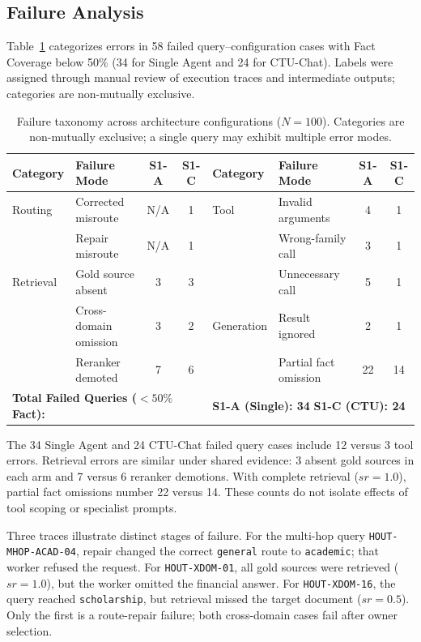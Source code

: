 \subsection{Failure Analysis}
\label{sec:failure_analysis}

Table~\ref{tab:failures} categorizes errors in 58 failed query--configuration cases with Fact Coverage below 50\% (34 for Single Agent and 24 for CTU-Chat). Labels were assigned through manual review of execution traces and intermediate outputs; categories are non-mutually exclusive.

\begin{table}[!htbp]
\centering
\caption{Failure taxonomy across architecture configurations ($N=100$). Categories are non-mutually exclusive; a single query may exhibit multiple error modes.}
\label{tab:failures}
{\footnotesize\setlength{\tabcolsep}{2.2pt}
\begin{tabular}{llcc|llcc}
\toprule
\textbf{Category} & \textbf{Failure Mode} & \textbf{S1-A} & \textbf{S1-C} & \textbf{Category} & \textbf{Failure Mode} & \textbf{S1-A} & \textbf{S1-C} \\
\midrule
Routing   & Corrected misroute     & N/A & 1 & Tool       & Invalid arguments     & 4 & 1 \\
          & Repair misroute         & N/A & 1 &            & Wrong-family call     & 3 & 1 \\
Retrieval & Gold source absent     & 3   & 3 &            & Unnecessary call      & 5 & 1 \\
          & Cross-domain omission  & 3   & 2 & Generation & Result ignored        & 2 & 1 \\
          & Reranker demoted       & 7   & 6 &            & Partial fact omission & 22 & 14 \\
\midrule
\multicolumn{4}{l|}{\textbf{Total Failed Queries ($<50\%$ Fact):}} & \multicolumn{4}{l}{\textbf{S1-A (Single): 34} \qquad \textbf{S1-C (CTU): 24}} \\
\bottomrule
\end{tabular}}
\end{table}

The 34 Single Agent and 24 CTU-Chat failed query cases include 12 versus 3 tool errors. Retrieval errors are similar under shared evidence: 3 absent gold sources in each arm and 7 versus 6 reranker demotions. With complete retrieval ($sr=1.0$), partial fact omissions number 22 versus 14. These counts do not isolate effects of tool scoping or specialist prompts.

Three traces illustrate distinct stages of failure. For the multi-hop query \texttt{HOUT-MHOP-}\allowbreak\texttt{ACAD-04}, repair changed the correct \texttt{general} route to \texttt{academic}; that worker refused the request. For \texttt{HOUT-XDOM-}\allowbreak\texttt{01}, all gold sources were retrieved ($sr{=}1.0$), but the worker omitted the financial answer. For \texttt{HOUT-XDOM-}\allowbreak\texttt{16}, the query reached \texttt{scholarship}, but retrieval missed the target document ($sr{=}0.5$). Only the first is a route-repair failure; both cross-domain cases fail after owner selection.

